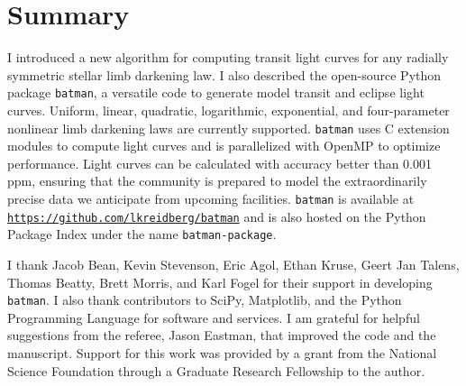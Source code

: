 \documentclass[12pt,preprint]{aastex}
\newcommand*{\blue}{\textcolor{blue}}
\begin{document}
\section{Summary}
\label{section:summary}
I introduced a new algorithm for computing transit light curves for any radially symmetric stellar limb darkening law.  I also described the open-source Python package \texttt{batman}, a versatile code to generate model transit and eclipse light curves. Uniform, linear, quadratic, logarithmic, exponential, and four-parameter nonlinear limb darkening laws are currently supported.  \texttt{batman} uses C extension modules to compute light curves and is parallelized with OpenMP to optimize performance.  Light curves can be calculated with accuracy better than 0.001 ppm, ensuring that the community is prepared to model the extraordinarily precise data we anticipate from upcoming facilities. \texttt{batman} is available at \texttt{\blue{\url{https://github.com/lkreidberg/batman}}} and is also hosted on the Python Package Index under the name \texttt{batman-package}.

\acknowledgments
I thank Jacob Bean, Kevin Stevenson, Eric Agol, Ethan Kruse, Geert Jan Talens, Thomas Beatty, Brett Morris, and Karl Fogel for their support in developing \texttt{batman}. I also thank contributors to SciPy, Matplotlib, and the Python Programming Language for software and services.  I am grateful for helpful suggestions from the referee, Jason Eastman, that improved the code and the manuscript. Support for this work was provided by a grant from the National Science Foundation through a Graduate Research Fellowship to the author.  

%


\end{document}

